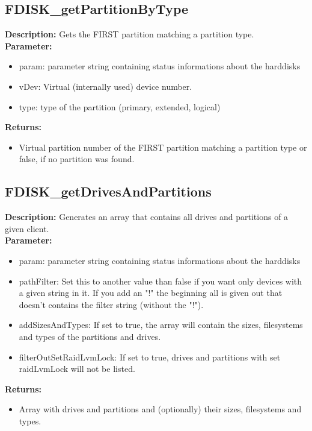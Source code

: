 \subsection{FDISK\_getPartitionByType}
\textbf{Description:} Gets the FIRST partition matching a partition type.\\
\textbf{Parameter:}
\begin{itemize}
\item param: parameter string containing status informations about the harddisks
\item vDev: Virtual (internally used) device number.
\item type: type of the partition (primary, extended, logical)
\end{itemize}
\textbf{Returns:}
\begin{itemize}
\item Virtual partition number of the FIRST partition matching a partition type or false, if no partition was found.
\end{itemize}

\subsection{FDISK\_getDrivesAndPartitions}
\textbf{Description:} Generates an array that contains all drives and partitions of a given client.\\
\textbf{Parameter:}
\begin{itemize}
\item param: parameter string containing status informations about the harddisks
\item pathFilter: Set this to another value than false if you want only devices with a given string in it. If you add an "!" the beginning all is given out that doesn't contains the filter string (without the "!").
\item addSizesAndTypes: If set to true, the array will contain the sizes, filesystems and types of the partitions and drives.
\item filterOutSetRaidLvmLock: If set to true, drives and partitions with set raidLvmLock will not be listed.
\end{itemize}
\textbf{Returns:}
\begin{itemize}
\item Array with drives and partitions and (optionally) their sizes, filesystems and types.
\end{itemize}

